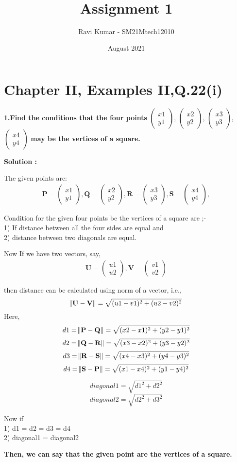 \documentclass{article}
\title{\textbf{\Huge Assignment 1}}
\author{\large Ravi Kumar - SM21Mtech12010}
\date{August 2021}
\begin{document}
\providecommand{\mbf}{\mathbf}


\newcommand{\myvec}[1]{\ensuremath{\begin{pmatrix}#1\end{pmatrix}}}
\let\vec\mathbf


\maketitle

\section*{Chapter II, Examples II,Q.22(i)}

\textbf{1.Find the conditions that the four points}
\myvec{x1\\y1}, \myvec{x2\\y2},
\myvec{x3\\y3}, \myvec{x4\\y4}
\textbf{ may be the vertices of a square.}


\textbf{Solution : }
\vspace{0.2cm}

The given points are:
\begin{align*}
\vec{P} = \myvec{x1\\y1}, \vec{Q} =\myvec{x2\\y2},
\vec{R} =\myvec{x3\\y3}, \vec{S} =\myvec{x4\\y4},
\end{align*}


Condition for the given four points be the vertices of a square are ;-\\
1) If distance between all the four sides are equal and\\
2) distance between two diagonals are equal.

\vspace{0.2cm}

Now If we have two vectors, say,
\begin{align*}
\vec{U} = \myvec{u1\\u2}, \vec{V} =\myvec{v1\\v2}
\end{align*} 


then distance can be calculated using norm of a vector, i.e., 
$$\norm{ \vec{U} - \vec{V}} = \sqrt{(u1-v1)^2+(u2-v2)^2}$$
Here, $$ d1=\norm{ \vec{P} - \vec{Q}} =\sqrt{(x2-x1)^2+(y2-y1)^2}$$
$$ d2=\norm{ \vec{Q} - \vec{R}} =\sqrt{(x3-x2)^2+(y3-y2)^2}$$
$$ d3=\norm{ \vec{R} - \vec{S}} =\sqrt{(x4-x3)^2+(y4-y3)^2}$$
$$ d4=\norm{ \vec{S} - \vec{P}} =\sqrt{(x1-x4)^2+(y1-y4)^2}$$

\vspace{0.2cm}

$$diagonal1 = \sqrt{d1^2+d2^2}$$
$$diagonal2 = \sqrt{d2^2+d3^2}$$



Now if \\ 1) d1 = d2 = d3 = d4\\ 
2) diagonal1 = diagonal2 


\textbf{Then, we can say that the given point are the vertices of a square.}
\end{document}
